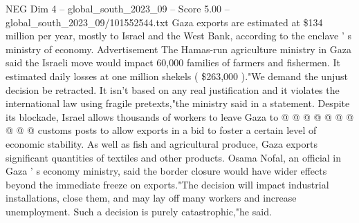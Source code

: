 \begin{textsample}{NEG Dim 4 – global\_south\_2023\_09 – Score 5.00 – global\_south\_2023\_09/101552544.txt}
Gaza exports are estimated at \$134 million per year, mostly to Israel and the West Bank, according to the enclave ' s ministry of economy.
Advertisement The Hamas-run agriculture ministry in Gaza said the Israeli move would impact 60,000 families of farmers and fishermen.
It estimated daily losses at one million shekels ( \$263,000 )."We demand the unjust decision be retracted.
It isn't based on any real justification and it violates the international law using fragile pretexts,"the ministry said in a statement.
Despite its blockade, Israel allows thousands of workers to leave Gaza to @ @ @ @ @ @ @ @ @ @ customs posts to allow exports in a bid to foster a certain level of economic stability.
As well as fish and agricultural produce, Gaza exports significant quantities of textiles and other products.
Osama Nofal, an official in Gaza ' s economy ministry, said the border closure would have wider effects beyond the immediate freeze on exports."The decision will impact industrial installations, close them, and may lay off many workers and increase unemployment.
Such a decision is purely catastrophic,"he said.

\end{textsample}
